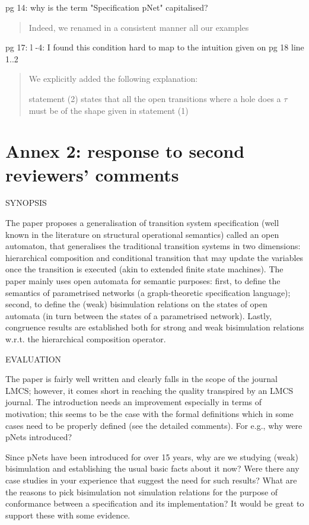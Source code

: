 \documentclass{article}
\begin{document}
pg 14:  why is the term "Specification pNet" capitalised?
\begin{quote}
Indeed, we renamed in a consistent manner all our examples
\end{quote}

pg 17: l -4: I found this condition hard to map to the intuition given on pg 18 line 1..2 
\begin{quote}
We explicitly added the following explanation:

statement (2) states that all the open transitions where a hole does  a $\tau$ must be of the shape given in statement (1)
\end{quote}


\section*{Annex 2: response to second reviewers' comments}
SYNOPSIS

The paper proposes a generalisation of transition system specification (well known in the literature on structural operational semantics) called an open automaton, that generalises the traditional transition systems in two dimensions: hierarchical composition and conditional transition that may update the variables once the transition is executed (akin to extended finite state machines). The paper mainly uses open automata for semantic purposes: first, to define the semantics of parametrised networks (a graph-theoretic specification language); second, to define the (weak) bisimulation relations on the states of open automata (in turn between the states of a parametrised network). Lastly, congruence results are established both for strong and weak bisimulation relations w.r.t. the hierarchical composition operator.

EVALUATION

The paper is fairly well written and clearly falls in the scope of the journal LMCS; however, it comes short in reaching the quality transpired by an LMCS journal.
The introduction needs an improvement especially in terms of motivation; this seems to be the case with the formal definitions which in some cases need to be properly defined (see the detailed comments). For e.g., why were pNets introduced? 

Since pNets have been introduced for over 15 years, why are we studying (weak) bisimulation and establishing the usual basic facts about it now? Were there any case studies in your experience that suggest the need for such results? What are the reasons to pick bisimulation not simulation relations for the purpose of conformance between a specification and its implementation? It would be great to support these with some evidence.
\end{document}
